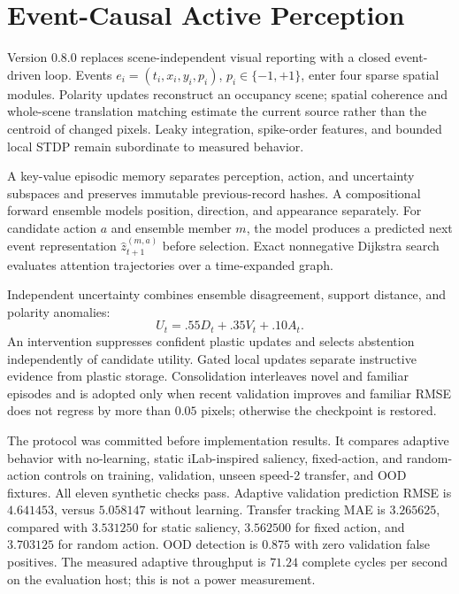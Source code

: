 \documentclass[11pt,a4paper]{article}
\begin{document}

\section{Event-Causal Active Perception}
Version 0.8.0 replaces scene-independent visual reporting with a closed event-driven loop. Events $e_i=(t_i,x_i,y_i,p_i)$, $p_i\in\{-1,+1\}$, enter four sparse spatial modules. Polarity updates reconstruct an occupancy scene; spatial coherence and whole-scene translation matching estimate the current source rather than the centroid of changed pixels. Leaky integration, spike-order features, and bounded local STDP remain subordinate to measured behavior.

A key-value episodic memory separates perception, action, and uncertainty subspaces and preserves immutable previous-record hashes. A compositional forward ensemble models position, direction, and appearance separately. For candidate action $a$ and ensemble member $m$, the model produces a predicted next event representation $\hat z_{t+1}^{(m,a)}$ before selection. Exact nonnegative Dijkstra search evaluates attention trajectories over a time-expanded graph.

Independent uncertainty combines ensemble disagreement, support distance, and polarity anomalies:
\begin{equation}
U_t=.55D_t+.35V_t+.10A_t.
\end{equation}
An intervention suppresses confident plastic updates and selects abstention independently of candidate utility. Gated local updates separate instructive evidence from plastic storage. Consolidation interleaves novel and familiar episodes and is adopted only when recent validation improves and familiar RMSE does not regress by more than $0.05$ pixels; otherwise the checkpoint is restored.

The protocol was committed before implementation results. It compares adaptive behavior with no-learning, static iLab-inspired saliency, fixed-action, and random-action controls on training, validation, unseen speed-2 transfer, and OOD fixtures. All eleven synthetic checks pass. Adaptive validation prediction RMSE is $4.641453$, versus $5.058147$ without learning. Transfer tracking MAE is $3.265625$, compared with $3.531250$ for static saliency, $3.562500$ for fixed action, and $3.703125$ for random action. OOD detection is $0.875$ with zero validation false positives. The measured adaptive throughput is $71.24$ complete cycles per second on the evaluation host; this is not a power measurement.
\end{document}
